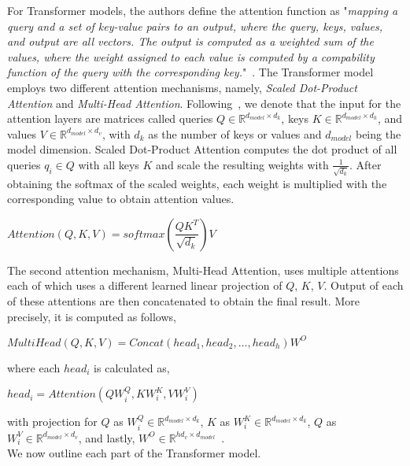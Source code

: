 For Transformer models, the authors define the attention function as "\emph{mapping a query and a set of key-value pairs to an output, where the query, keys, values, and output are all vectors. The output is computed as a weighted sum of the values, where the weight assigned to each value is computed by a compability function of the query with the corresponding key.}"~\parencite{AttentionIsAllYouNeed_Vaswani}. The Transformer model employs two different attention mechanisms, namely, \emph{Scaled Dot-Product Attention} and \emph{Multi-Head Attention}. Following~\parencite{AttentionIsAllYouNeed_Vaswani}, we denote that the input for the attention layers are matrices called queries $Q \in \mathbb{R}^{d_{model} \times d_k}$, keys $K \in \mathbb{R}^{d_{model} \times d_k}$, and values $V \in \mathbb{R}^{d_{model} \times d_v}$, with $d_k$ as the number of keys or values and $d_{model}$ being the model dimension. Scaled Dot-Product Attention computes the dot product of all queries $q_i \in Q$ with all keys $K$ and scale the resulting weights with $\frac{1}{\sqrt{d_k}}$. After obtaining the softmax of the scaled weights, each weight is multiplied with the corresponding value to obtain attention values.
\begin{center}
    $Attention(Q, K, V) = softmax(\dfrac{QK^T}{\sqrt{d_k}})V$
\end{center}
The second attention mechanism, Multi-Head Attention, uses multiple attentions each of which uses a different learned linear projection of $Q$, $K$, $V$. Output of each of these attentions are then concatenated to obtain the final result. More precisely, it is computed as follows,
\begin{center}
    $MultiHead(Q, K, V) = Concat(head_1, head_2, \dots, head_h)W^{O}$
\end{center}
where each $head_i$ is calculated as,
\begin{center}
    $head_i = Attention(QW_i^Q, KW_i^K, VW_i^V)$
\end{center}
with projection for $Q$ as $W_i^Q \in \mathbb{R}^{d_{model} \times d_k}$, $K$ as $W_i^K \in \mathbb{R}^{d_{model} \times d_k}$, $Q$ as $W_i^V \in \mathbb{R}^{d_{model} \times d_v}$, and lastly, $W^{O} \in \mathbb{R}^{hd_v \times d_{model}}$~\parencite{AttentionIsAllYouNeed_Vaswani}.\\
We now outline each part of the Transformer model.\\

